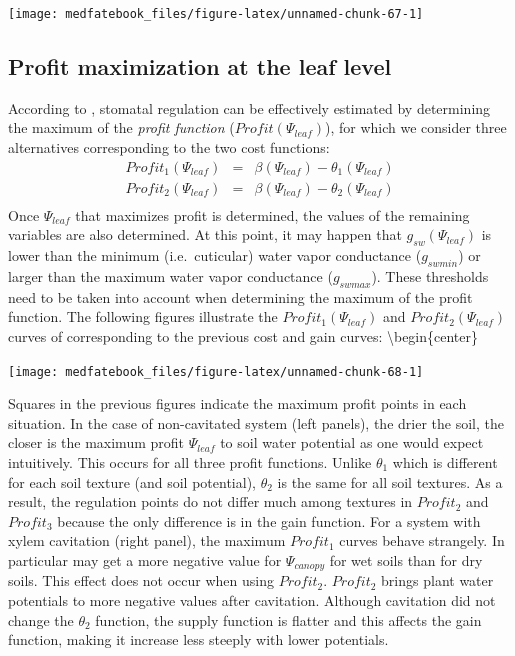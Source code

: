 \documentclass[]{book}
\begin{document}
\begin{center}\texttt{[image: medfatebook\_files/figure-latex/unnamed-chunk-67-1]} \end{center}

\hypertarget{profit-maximization-at-the-leaf-level}{%
\subsection{Profit maximization at the leaf level}\label{profit-maximization-at-the-leaf-level}}

According to \citet{Sperry2016}, stomatal regulation can be effectively estimated by determining the maximum of the \emph{profit function} (\(Profit(\Psi_{leaf})\)), for which we consider three alternatives corresponding to the two cost functions:
\begin{eqnarray}
Profit_1(\Psi_{leaf}) &=& \beta(\Psi_{leaf})-\theta_1(\Psi_{leaf})\\
Profit_2(\Psi_{leaf}) &=& \beta(\Psi_{leaf})-\theta_2(\Psi_{leaf})\\
\end{eqnarray}
Once \(\Psi_{leaf}\) that maximizes profit is determined, the values of the remaining variables are also determined. At this point, it may happen that \(g_{sw}(\Psi_{leaf})\) is lower than the minimum (i.e.~cuticular) water vapor conductance (\(g_{swmin}\)) or larger than the maximum water vapor conductance (\(g_{swmax}\)). These thresholds need to be taken into account when determining the maximum of the profit function. The following figures illustrate the \(Profit_1(\Psi_{leaf})\) and \(Profit_2(\Psi_{leaf})\) curves of corresponding to the previous cost and gain curves:
\textbackslash{}begin\{center\}

\begin{center}\texttt{[image: medfatebook\_files/figure-latex/unnamed-chunk-68-1]} \end{center}

Squares in the previous figures indicate the maximum profit points in each situation. In the case of non-cavitated system (left panels), the drier the soil, the closer is the maximum profit \(\Psi_{leaf}\) to soil water potential as one would expect intuitively. This occurs for all three profit functions. Unlike \(\theta_1\) which is different for each soil texture (and soil potential), \(\theta_2\) is the same for all soil textures. As a result, the regulation points do not differ much among textures in \(Profit_2\) and \(Profit_3\) because the only difference is in the gain function. For a system with xylem cavitation (right panel), the maximum \(Profit_1\) curves behave strangely. In particular may get a more negative value for \(\Psi_{canopy}\) for wet soils than for dry soils. This effect does not occur when using \(Profit_2\). \(Profit_2\) brings plant water potentials to more negative values after cavitation. Although cavitation did not change the \(\theta_2\) function, the supply function is flatter and this affects the gain function, making it increase less steeply with lower potentials.
\end{document}
